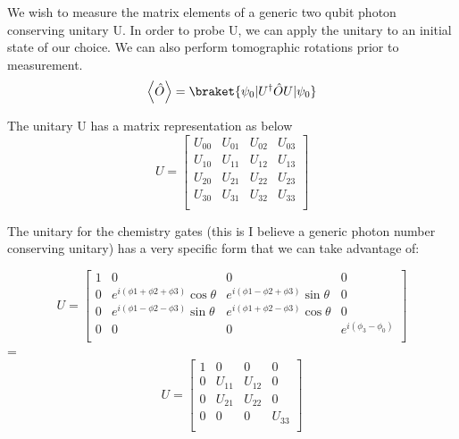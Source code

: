 We wish to measure the matrix elements of a generic two qubit photon conserving unitary U.
In order to probe U, we can apply the unitary to an initial state of our choice.  We can also perform tomographic rotations prior to measurement.
\begin{equation}
    \left< \hat{O} \right> = \braket{\psi_0 | U^{\dagger} \hat{O} U | \psi_0 }
\end{equation}

The unitary U has a matrix representation as below
\begin{equation}
    U =
    \begin{bmatrix}
        U_{00} & U_{01} & U_{02} & U_{03} \\
        U_{10} & U_{11} & U_{12} & U_{13} \\
        U_{20} & U_{21} & U_{22} & U_{23} \\
        U_{30} & U_{31} & U_{32} & U_{33} \\
    \end{bmatrix}
\end{equation}

The unitary for the chemistry gates (this is I believe a generic photon number conserving unitary) has a very specific form that we can take advantage of:

\begin{equation}
    U=
    \begin{bmatrix}
        1 & 0 & 0 & 0 \\
        0 & e^{ i (\phi{1} + \phi{2} + \phi{3})}\cos{\theta} & e^{ i (\phi{1} - \phi{2} + \phi{3})}\sin{\theta} & 0 \\
        0 & e^{ i (\phi{1} - \phi{2} - \phi{3})}\sin{\theta} & e^{ i (\phi{1} + \phi{2} - \phi{3})}\cos{\theta} & 0 \\
        0 & 0 & 0 & e^{i (\phi_{3}-\phi_{0})} \\
    \end{bmatrix}
\end{equation}=
\begin{equation}
    U=
    \begin{bmatrix}
        1 & 0 & 0 & 0 \\
        0 & U_{11} & U_{12} & 0 \\
        0 & U_{21} & U_{22} & 0 \\
        0 & 0 & 0 & U_{33} \\
    \end{bmatrix}
\end{equation}

